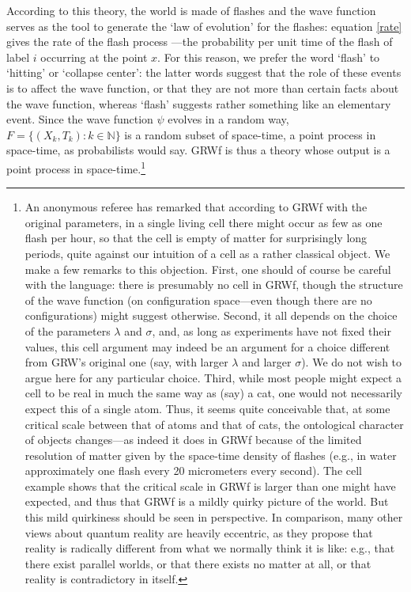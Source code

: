 \documentclass[12pt]{article}
\newcommand{\NNN}{\mathbb{N}}
\begin{document}
According to this theory, the world is made of flashes and the wave function serves as the tool to generate
the `law of evolution' for the flashes: equation \eqref{rate} gives the rate of the flash process ---the probability per unit time of the flash of label $i$ occurring at the point $x$.  
 For this reason, we prefer the word `flash' to `hitting' or `collapse center': the latter words suggest that the role of these events is to affect the wave function, or that they are not more than certain facts about the wave function, whereas `flash' suggests rather something like an elementary event. Since the wave function $\psi$ evolves in a random way, $F=\{(X_k,T_k): k\in \NNN\}$ is a random subset of space-time, a point process in space-time, as probabilists would say. {\sf GRWf} is thus a theory whose output is a point process in space-time.\footnote{An anonymous referee has remarked that according to {\sf GRWf} with the original parameters, in a single living cell there might occur as few as one flash per hour, so that the cell is empty of matter for surprisingly long periods, quite against our intuition of a cell as a rather classical object. We make a few remarks to this objection. First, one should of course be careful with the language: there is presumably no cell in {\sf GRWf}, though the structure of the wave function (on configuration space---even though there are no configurations) might suggest otherwise. 
Second, it all depends on the choice of the parameters $\lambda$ and $\sigma$, and, as long as experiments have not fixed their values, this cell argument may indeed be an argument for a choice different from GRW's original one (say, with larger $\lambda$ and larger $\sigma$). We do not wish to argue here for any particular choice. 
Third, while most people might expect a cell to be real in much the same way as (say) a cat, one would not necessarily expect this of a single atom. Thus, it seems quite conceivable that, at some critical scale between that of atoms and that of cats, the ontological character of objects changes---as indeed it does in {\sf GRWf} because of the limited resolution of matter given by the space-time density of flashes (e.g., in water approximately one flash every 20 micrometers every second). The cell example shows that the critical scale in {\sf GRWf} is larger than one might have expected, and thus that {\sf GRWf} is a mildly quirky picture of the world. But this mild quirkiness should be seen in perspective. In comparison, many other views about quantum reality are heavily eccentric, as they propose that reality is radically different from what we normally think it is like: e.g., that there exist parallel worlds, or that there exists no matter at all, or that reality is contradictory in itself.}
\end{document}
